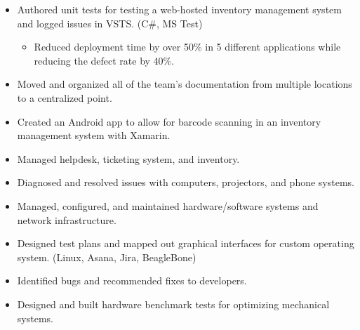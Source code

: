 \documentclass[10pt,letterpaper,sans]{moderncv}   %
\begin{document}
{ {}
\begin{itemize}
    \item Authored unit tests for testing a web-hosted inventory management system and logged issues in VSTS. (C\#, MS Test)
    \begin{itemize}
        \item Reduced deployment time by over 50\% in 5 different applications while reducing the defect rate by 40\%.
    \end{itemize}
    \item Moved and organized all of the team’s documentation from multiple locations to a centralized point.
    \item Created an Android app to allow for barcode scanning in an inventory management system with Xamarin.
\end{itemize}}


{ {}
\begin{itemize}
  \item Managed helpdesk, ticketing system, and inventory.
  \item Diagnosed and resolved issues with computers, projectors, and phone systems.
  \item Managed, configured, and maintained hardware/software systems and network infrastructure.
\end{itemize}
}

{ {}
\begin{itemize}
  \item Designed test plans and mapped out graphical interfaces for custom operating system.  (Linux, Asana, Jira, BeagleBone)
  \item Identified bugs and recommended fixes to developers.
  \item Designed and built hardware benchmark tests for optimizing mechanical systems.
\end{itemize}
}

\end{document}
